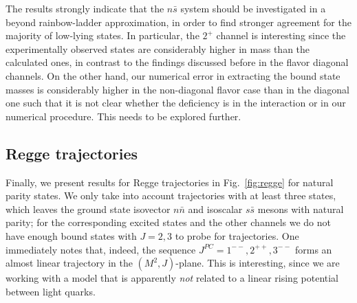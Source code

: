The results strongly indicate that the $n\bar{s}$ system should be investigated in a beyond rainbow-ladder 
approximation, in order to find stronger agreement for the majority of low-lying states. In particular, the
$2^+$ channel is interesting since the experimentally observed states are considerably higher in mass than 
the calculated ones, in contrast to the findings discussed before in the flavor diagonal channels. On the
other hand, our numerical error in extracting the bound state masses is considerably higher in the
non-diagonal flavor case than in the diagonal one such that it is not clear whether the deficiency is in the
interaction or in our numerical procedure. This needs to be explored further.

%
%
%
%
%
\subsection*{Regge trajectories}\label{res:regge}
Finally, we present results for Regge trajectories in Fig.~\ref{fig:regge} for natural parity states. 
We only take into account trajectories with at least three states, which leaves the ground state isovector $n\bar{n}$ 
and isoscalar $s\bar{s}$ mesons with natural parity; for the corresponding excited states and the 
other channels we do not have enough bound states with $J=2,3$ to probe for trajectories. 
One immediately notes that, indeed, the sequence $J^{PC}=1^{--}, 2^{++}, 3^{--}$ forms an almost linear
trajectory in the $(M^2,J)$-plane. This is interesting, since we are working with a model that is
apparently \emph{not} related to a linear rising potential between light quarks. 

